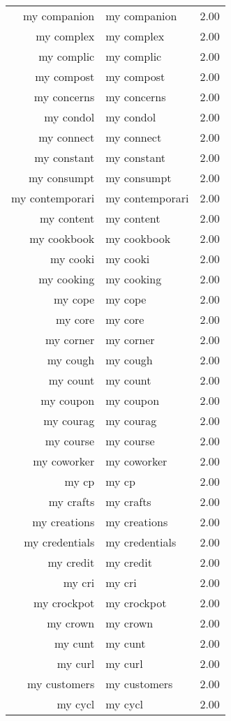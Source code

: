 \begin{table}[ht]
\begin{tabular}{rlr}
  my companion & my companion & 2.00 \\ 
  my complex & my complex & 2.00 \\ 
  my complic & my complic & 2.00 \\ 
  my compost & my compost & 2.00 \\ 
  my concerns & my concerns & 2.00 \\ 
  my condol & my condol & 2.00 \\ 
  my connect & my connect & 2.00 \\ 
  my constant & my constant & 2.00 \\ 
  my consumpt & my consumpt & 2.00 \\ 
  my contemporari & my contemporari & 2.00 \\ 
  my content & my content & 2.00 \\ 
  my cookbook & my cookbook & 2.00 \\ 
  my cooki & my cooki & 2.00 \\ 
  my cooking & my cooking & 2.00 \\ 
  my cope & my cope & 2.00 \\ 
  my core & my core & 2.00 \\ 
  my corner & my corner & 2.00 \\ 
  my cough & my cough & 2.00 \\ 
  my count & my count & 2.00 \\ 
  my coupon & my coupon & 2.00 \\ 
  my courag & my courag & 2.00 \\ 
  my course & my course & 2.00 \\ 
  my coworker & my coworker & 2.00 \\ 
  my cp & my cp & 2.00 \\ 
  my crafts & my crafts & 2.00 \\ 
  my creations & my creations & 2.00 \\ 
  my credentials & my credentials & 2.00 \\ 
  my credit & my credit & 2.00 \\ 
  my cri & my cri & 2.00 \\ 
  my crockpot & my crockpot & 2.00 \\ 
  my crown & my crown & 2.00 \\ 
  my cunt & my cunt & 2.00 \\ 
  my curl & my curl & 2.00 \\ 
  my customers & my customers & 2.00 \\ 
  my cycl & my cycl & 2.00 \\ 

\end{tabular}
\end{table}
